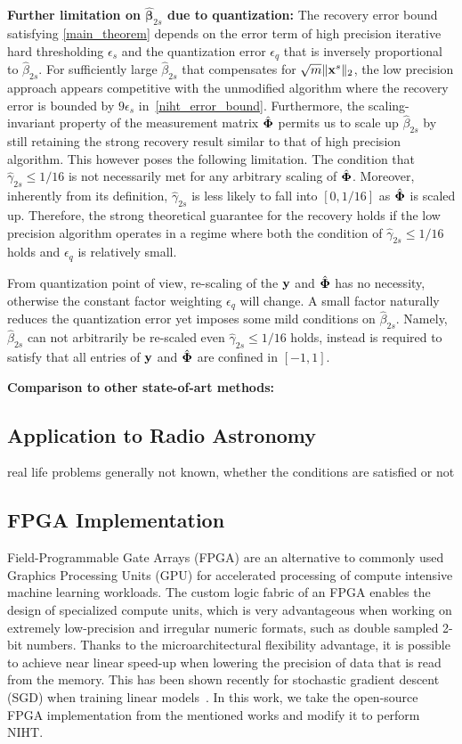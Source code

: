 \documentclass{article}
\begin{document}
{\bf Further limitation on $\hat{\boldsymbol{\beta}}_{2s}$ due to quantization:} The recovery error bound satisfying \ref{main_theorem} depends on the error term of high precision iterative hard thresholding $\epsilon_s$ and the quantization error $\epsilon_q$ that is inversely proportional to $\hat{\beta}_{2s}$. For sufficiently large $\hat{\beta}_{2s}$ that compensates for $\sqrt{m} \|{\bf x}^s \|_2$, the low precision approach appears competitive with the unmodified algorithm where the recovery error is bounded by $9\epsilon_s$ in~\ref{niht_error_bound}. Furthermore, the scaling-invariant property of the measurement matrix $\hat{\bf \Phi}$ permits us to scale up $\hat{\beta}_{2s}$ by still retaining the strong recovery result similar to that of high precision algorithm. This however poses the following limitation. The condition that $\hat{\gamma}_{2s}\leq 1/16$ is not necessarily met for any arbitrary scaling of $\hat{\bf \Phi}$. Moreover, inherently from its definition, $\hat{\gamma}_{2s}$ is less likely to fall into $[0, 1/16]$ as $\hat{\bf \Phi}$ is scaled up. Therefore, the strong theoretical guarantee for the recovery holds if the low precision algorithm operates in a regime where both the condition of $\hat{\gamma}_{2s}\leq 1/16$ holds and $\epsilon_q$ is relatively small.

From quantization point of view, re-scaling of the ${\bf y}$ and $\hat{\bf \Phi}$ has no necessity,
otherwise the constant factor weighting $\epsilon_q$ will change. A small factor naturally reduces the quantization error yet imposes some mild conditions on $\hat{\beta}_{2s}$. Namely, $\hat{\beta}_{2s}$ can not arbitrarily be re-scaled even $\hat{\gamma}_{2s}\leq 1/16$ holds, instead is required to satisfy that all entries of ${\bf y}$ and $\hat{\bf \Phi}$ are confined in $[-1, 1]$.

{\bf Comparison to other state-of-art methods:}

\subsection{Application to Radio Astronomy}
real life problems generally not known, whether the conditions are satisfied or not



\subsection{FPGA Implementation}
Field-Programmable Gate Arrays (FPGA) are an alternative to commonly used Graphics Processing Units (GPU) for accelerated processing of compute intensive machine learning workloads. The custom logic fabric of an FPGA enables the design of specialized compute units, which is very advantageous when working on extremely low-precision and irregular numeric formats, such as double sampled 2-bit numbers. Thanks to the microarchitectural flexibility advantage, it is possible to achieve near linear speed-up when lowering the precision of data that is read from the memory. This has been shown recently for stochastic gradient descent (SGD) when training linear models~\cite{zhang2017zipml, kara2017fpga}. In this work, we take the open-source FPGA implementation from the mentioned works and modify it to perform NIHT.
\end{document}
